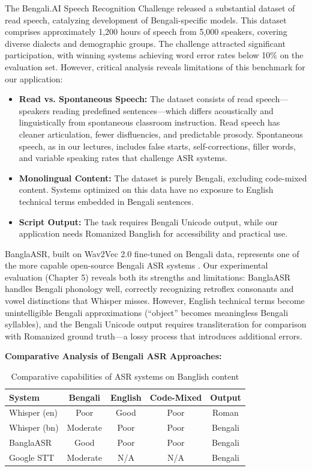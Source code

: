 The Bengali.AI Speech Recognition Challenge \cite{BengaliAI2023} released a substantial dataset of read speech, catalyzing development of Bengali-specific models. This dataset comprises approximately 1,200 hours of speech from 5,000 speakers, covering diverse dialects and demographic groups. The challenge attracted significant participation, with winning systems achieving word error rates below 10\% on the evaluation set. However, critical analysis reveals limitations of this benchmark for our application:

\begin{itemize}
    \item \textbf{Read vs. Spontaneous Speech:} The dataset consists of read speech---speakers reading predefined sentences---which differs acoustically and linguistically from spontaneous classroom instruction. Read speech has cleaner articulation, fewer disfluencies, and predictable prosody. Spontaneous speech, as in our lectures, includes false starts, self-corrections, filler words, and variable speaking rates that challenge ASR systems.
    \item \textbf{Monolingual Content:} The dataset is purely Bengali, excluding code-mixed content. Systems optimized on this data have no exposure to English technical terms embedded in Bengali sentences.
    \item \textbf{Script Output:} The task requires Bengali Unicode output, while our application needs Romanized Banglish for accessibility and practical use.
\end{itemize}

BanglaASR, built on Wav2Vec 2.0 fine-tuned on Bengali data, represents one of the more capable open-source Bengali ASR systems \cite{BanglaASR2023}. Our experimental evaluation (Chapter 5) reveals both its strengths and limitations: BanglaASR handles Bengali phonology well, correctly recognizing retroflex consonants and vowel distinctions that Whisper misses. However, English technical terms become unintelligible Bengali approximations (``object'' becomes meaningless Bengali syllables), and the Bengali Unicode output requires transliteration for comparison with Romanized ground truth---a lossy process that introduces additional errors.

\textbf{Comparative Analysis of Bengali ASR Approaches:}

\begin{table}[h]
\centering
\begin{tabular}{|l|c|c|c|c|}
\hline
\textbf{System} & \textbf{Bengali} & \textbf{English} & \textbf{Code-Mixed} & \textbf{Output} \\
\hline
Whisper (en) & Poor & Good & Poor & Roman \\
Whisper (bn) & Moderate & Poor & Poor & Bengali \\
BanglaASR & Good & Poor & Poor & Bengali \\
Google STT & Moderate & N/A & N/A & Bengali \\
\hline
\end{tabular}
\caption{Comparative capabilities of ASR systems on Banglish content}
\end{table}

